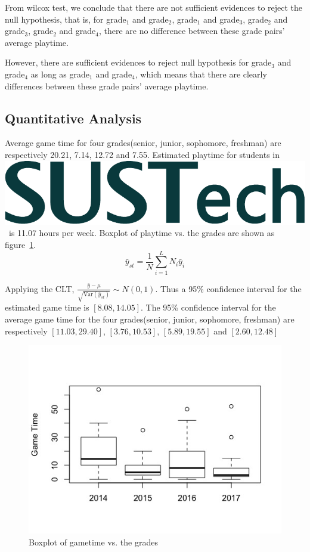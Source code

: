 \documentclass[scheme=plain]{ctexart}
\newcommand{\SUSTech}{\includegraphics[height=2ex]{logo}}
\begin{document}
From wilcox test, we conclude that there are not sufficient evidences to reject the null hypothesis, that is, for grade$_1$ and grade$_2$, grade$_1$ and grade$_3$, grade$_2$ and grade$_3$, grade$_2$ and grade$_4$, there are no difference between these grade pairs' average playtime.

However, there are sufficient evidences to reject null hypothesis for grade$_3$ and grade$_4$ as long as grade$_1$ and grade$_4$, which means that there are clearly differences between these grade pairs' average playtime.


\subsection{Quantitative Analysis}
Average game time for four grades(senior, junior, sophomore, freshman) are respectively 20.21, 7.14, 12.72 and 7.55. Estimated playtime for students in \SUSTech\ is 11.07 hours per week. Boxplot of playtime vs. the grades are shown as figure~\ref{F:Data-4}.
\begin{equation}\label{E:temp-1}
    \bar{y}_{st} = \frac{1}{N}\sum_{i=1}^{L}N_i\bar{y}_i
\end{equation}

Applying the CLT, $\tfrac{\bar{y}-\mu}{\sqrt{\mathrm{Var}(\bar{y}_{st})}}\sim N(0,1)$. Thus a 95\%  confidence interval for the estimated game time is $[8.08,14.05]$. The 95\% confidence interval for the average game time for the four grades(senior, junior, sophomore, freshman) are respectively $[11.03,29.40]$, $[3.76,10.53]$, $[5.89,19.55]$ and $[2.60,12.48]$

\begin{figure}[H]
    \centering
    \includegraphics[width=.7\textwidth]{7}
    \caption{Boxplot of gametime vs. the grades}\label{F:Data-4}
\end{figure}
\end{document}

